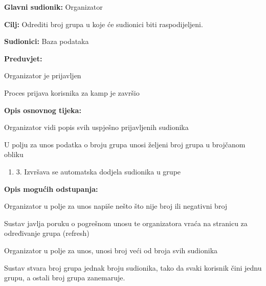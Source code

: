 \noindent {}
\begin{packed_item}

	\item \textbf{Glavni sudionik: }Organizator
	\item  \textbf{Cilj:} Odrediti broj grupa u koje će sudionici biti raspodijeljeni.
	\item  \textbf{Sudionici:} Baza podataka
	\item  \textbf{Preduvjet:} \begin{packed_enum}


								   \item Organizator je prijavljen
								   \item Proces prijava korisnika za kamp je završio
	\end{packed_enum}
	\item  \textbf{Opis osnovnog tijeka:}

	\item[] \begin{packed_enum}

				\item Organizator vidi popis svih uspješno prijavljenih sudionika
				\item U polju za unos podatka o broju grupa unosi željeni broj grupa u brojčanom       obliku
				\begin{enumerate}
					\item 3.	Izvršava se automatska dodjela sudionika u grupe
				\end{enumerate}
	\end{packed_enum}

	\item  \textbf{Opis mogućih odstupanja:}

	\item[] \begin{packed_item}

				\item[2.a] Organizator u polje za unos napiše nešto što nije broj ili negativni broj
				\item[] \begin{packed_enum}

							\item Sustav javlja poruku o pogrešnom unosu te organizatora vraća na          stranicu za određivanje grupa (refresh)

				\end{packed_enum}
				\item[2.b]Organizator u polje za unos, unosi broj veći od broja svih sudionika
				\item[] \begin{packed_enum}

							\item	Sustav stvara broj grupa jednak broju sudionika, tako da svaki           korisnik čini jednu grupu, a ostali broj grupa zanemaruje.


				\end{packed_enum}



	\end{packed_item}
\end{packed_item}

